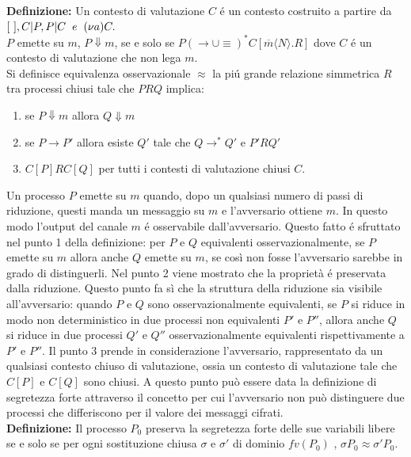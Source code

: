 \documentclass[12pt]{article}
\begin{document}
\textbf{Definizione:}  Un contesto di valutazione $C$ é un contesto costruito a partire da $[\ ], C | P, P|C \hspace{2mm}e\hspace{2mm} (\nu a)C.$\\
$P$ emette su $m$, $P \Downarrow m$, se e solo se $P (\rightarrow \cup \equiv)^* C[\overline{m}\langle N \rangle.R]$ dove $C$ é un contesto di valutazione che non lega $m$.\\

Si definisce equivalenza osservazionale $\approx$ la piú grande relazione simmetrica $R$ tra processi chiusi tale che $PRQ$ implica:\\
\begin{enumerate}
    \item se $P \Downarrow m$ allora $Q \Downarrow m$
    \item se $P \rightarrow P'$ allora esiste $Q'$ tale che $Q \rightarrow^* Q'$ e $P'RQ'$
    \item $C[P]RC[Q]$ per tutti i contesti di valutazione chiusi $C$.
\end{enumerate}
Un processo $P$ emette su $m$ quando, dopo un qualsiasi numero di passi di riduzione, questi manda un messaggio su $m$ e l'avversario ottiene $m$. In questo modo l'output del canale $m$ é osservabile dall'avversario. Questo fatto é sfruttato nel punto 1 della definizione: per $P$ e $Q$ equivalenti osservazionalmente, se $P$ emette su $m$ allora anche $Q$ emette su $m$, se così non fosse l'avversario sarebbe in grado di distinguerli. Nel punto 2 viene mostrato che la proprietà é preservata dalla riduzione. Questo punto fa sì che la struttura della riduzione sia visibile all'avversario: quando $P$ e $Q$ sono osservazionalmente equivalenti, se $P$ si riduce in modo non deterministico in due processi non equivalenti $P'$ e $P''$, allora anche $Q$ si riduce in due processi $Q'$ e $Q''$ osservazionalmente equivalenti rispettivamente a $P'$ e $P''$. Il punto 3 prende in considerazione l'avversario, rappresentato da un qualsiasi contesto chiuso di valutazione, ossia un contesto di valutazione tale che $C[P]$ e $C[Q]$ sono chiusi. A questo punto può essere data la definizione di segretezza forte attraverso il concetto per cui l'avversario non può distinguere due processi che differiscono per il valore dei messaggi cifrati.\\

\textbf{Definizione:} Il processo $P_0$ preserva la segretezza forte delle sue variabili libere se e solo se per ogni sostituzione chiusa $\sigma$ e $\sigma'$ di dominio $fv(P_0)$ , $\sigma P_0 \approx \sigma' P_0$.\\
\end{document}
